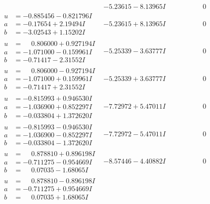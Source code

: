 \documentclass[1p]{elsarticle_modified}
\theoremstyle{definition}
\begin{document}
$$\begin{array}{c|c|c}
 & -5.23615 - 8.13965 I & \phantom{-0.000000 } 0 \\ \hline\begin{aligned}
u &= -0.885456 - 0.821796 I \\
a &= -0.17654 + 2.19494 I \\
b &= -3.02543 + 1.15202 I\end{aligned}
 & -5.23615 + 8.13965 I & \phantom{-0.000000 } 0 \\ \hline\begin{aligned}
u &= \phantom{-}0.806000 + 0.927194 I \\
a &= -1.071000 - 0.159961 I \\
b &= -0.71417 - 2.31552 I\end{aligned}
 & -5.25339 - 3.63777 I & \phantom{-0.000000 } 0 \\ \hline\begin{aligned}
u &= \phantom{-}0.806000 - 0.927194 I \\
a &= -1.071000 + 0.159961 I \\
b &= -0.71417 + 2.31552 I\end{aligned}
 & -5.25339 + 3.63777 I & \phantom{-0.000000 } 0 \\ \hline\begin{aligned}
u &= -0.815993 + 0.946530 I \\
a &= -1.036900 + 0.852297 I \\
b &= -0.033804 + 1.372620 I\end{aligned}
 & -7.72972 + 5.47011 I & \phantom{-0.000000 } 0 \\ \hline\begin{aligned}
u &= -0.815993 - 0.946530 I \\
a &= -1.036900 - 0.852297 I \\
b &= -0.033804 - 1.372620 I\end{aligned}
 & -7.72972 - 5.47011 I & \phantom{-0.000000 } 0 \\ \hline\begin{aligned}
u &= \phantom{-}0.878810 + 0.896198 I \\
a &= -0.711275 - 0.954669 I \\
b &= \phantom{-}0.07035 - 1.68065 I\end{aligned}
 & -8.57446 - 4.40882 I & \phantom{-0.000000 } 0 \\ \hline\begin{aligned}
u &= \phantom{-}0.878810 - 0.896198 I \\
a &= -0.711275 + 0.954669 I \\
b &= \phantom{-}0.07035 + 1.68065 I\end{aligned}

\end{array}$$
\end{document}
